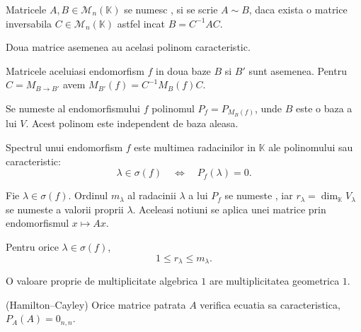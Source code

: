 \documentclass{article}
\begin{document}
\begin{enumerate}
   Matricele $A,B\in\mathcal M_n(\mathbb K)$ se numesc , si se scrie $A\sim B$, daca exista o matrice inversabila $C\in\mathcal M_n(\mathbb K)$ astfel incat $B=C^{-1}AC$.

  \proprietate Doua matrice asemenea au acelasi polinom caracteristic.

  \observatie Matricele aceluiasi endomorfism $f$ in doua baze $B$ si $B'$ sunt asemenea. Pentru $C=M_{B\to B'}$ avem $M_{B'}(f)=C^{-1}M_B(f)C$.

   Se numeste  al endomorfismului $f$ polinomul $P_f=P_{M_B(f)}$, unde $B$ este o baza a lui $V$. Acest polinom este independent de baza aleasa.

  \begin{tcolorbox}
    \teorema Spectrul unui endomorfism $f$ este multimea radacinilor in $\mathbb K$ ale polinomului sau caracteristic:
    \[
      \lambda\in\sigma(f)\quad\Leftrightarrow\quad P_f(\lambda)=0.
    \]
  \end{tcolorbox}

   Fie $\lambda\in\sigma(f)$. Ordinul $m_\lambda$ al radacinii $\lambda$ a lui $P_f$ se numeste , iar $r_\lambda=\dim_{\mathbb K}V_\lambda$ se numeste  a valorii proprii $\lambda$. Aceleasi notiuni se aplica unei matrice prin endomorfismul $x\mapsto Ax$.

  \begin{tcolorbox}
    \teorema Pentru orice $\lambda\in\sigma(f)$,
    \[
      1\leq r_\lambda\leq m_\lambda.
    \]
  \end{tcolorbox}

  \corolar O valoare proprie de multiplicitate algebrica $1$ are multiplicitatea geometrica $1$.

  \begin{tcolorbox}
    \teorema (Hamilton--Cayley) Orice matrice patrata $A$ verifica ecuatia sa caracteristica, $P_A(A)=0_{n,n}$.
  \end{tcolorbox}

\end{enumerate}
\end{document}
